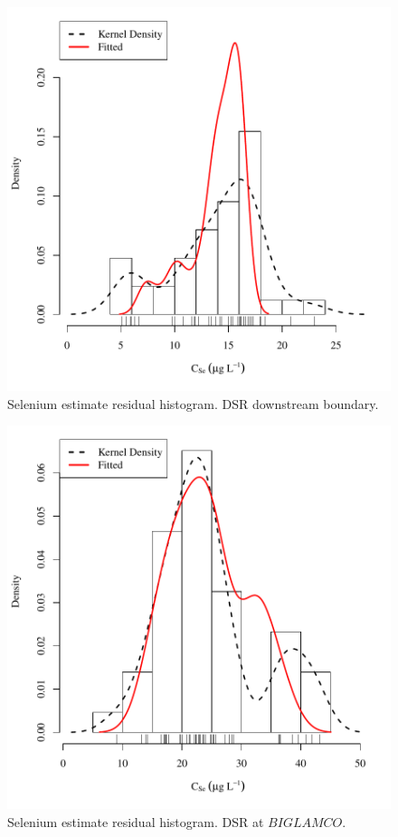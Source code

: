 \begin{figure}[htbp]
	\begin{center}
	\includegraphics[width=6in]{"Figures/Results_DSR/Conc Model ResDist D106C"}
	\caption{Selenium estimate residual histogram.  DSR downstream boundary.}
	\end{center}
\end{figure}
\newpage

\begin{figure}[htbp]
	\begin{center}
	\includegraphics[width=6in]{"Figures/Results_DSR/Conc Model ResDist BIG"}
	\caption{Selenium estimate residual histogram.  DSR at $BIGLAMCO$.}
	\end{center}
\end{figure}
\newpage

